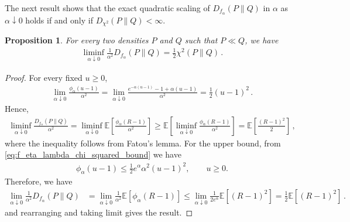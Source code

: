 \documentclass{article}
\theoremstyle{plain}
\newtheorem{proposition}[theorem]{Proposition}
\theoremstyle{definition}
\theoremstyle{plain}
\newcommand{\E}{\mathbb E}
\begin{document}
The next result shows that the exact quadratic scaling
of $D_{f_\alpha}(P\|Q)$ in $\alpha$ as $\alpha \downarrow 0$ holds if and only if $D_{\chi^2}(P\|Q)<\infty$.
\begin{proposition}
    \label{prop:exact_quadratic_forces_chi2}
    For every two densities $P$ and $Q$ such that $P \ll Q$, we have
    \begin{align}
        \liminf_{\alpha\downarrow0}
        \frac{1}{\alpha^2}
        D_{f_{\alpha}}(P\|Q)
        =
        \frac{1}{2}
        \chi^2(P\|Q)\,.
    \end{align}
\end{proposition}
\begin{proof}
    For every fixed $u\ge0$,
    \begin{align}
        \lim_{\alpha\downarrow0}
        \frac{\phi_\alpha(u-1)}{\alpha^2}
        =
        \lim_{\alpha\downarrow0}
        \frac{e^{-\alpha(u-1)} - 1 + \alpha(u-1)}{\alpha^2}
        =
        \frac12(u-1)^2\,.
    \end{align}
    Hence,
    \begin{align}
        \liminf_{\alpha \downarrow 0}
        \frac{D_{f_{\alpha}}(P\|Q)}{\alpha^2}
        =
        \liminf_{\alpha\downarrow0}
        \E\left[
            \frac{\phi_{\alpha}(R-1)}{\alpha^2}
            \right]
        \geq
        \E\left[
            \liminf_{\alpha\downarrow0}
            \frac{\phi_{\alpha}(R-1)}{\alpha^2}
            \right]
        =
        \E\left[\frac{(R-1)^2}{2}\right]\,,
    \end{align}
    where the inequality follows from Fatou's lemma.
    For the upper bound, from \cref{eq:f_eta_lambda_chi_squared_bound} we have
    \begin{align}
        \phi_\alpha(u-1)
        \le
        \frac12 e^{\alpha} \alpha^2(u-1)^2,
        \qquad u\ge0.
    \end{align}
    Therefore, we have
    \begin{align}
        \lim_{\alpha\downarrow0}
        \frac{1}{\alpha^2}
        D_{f_\alpha}(P\|Q)
         & =
        \lim_{\alpha\downarrow0}
        \frac{1}{\alpha^2}
        \E\left[
            \phi_\alpha(R-1)
            \right]
        \le
        \lim_{\alpha\downarrow0}
        \frac{1}{2 e^{\alpha}}
        \E[(R-1)^2]
        =
        \frac12 \E[(R-1)^2]\,.
    \end{align}
    and rearranging and taking limit gives the result.
\end{proof}
\end{document}
